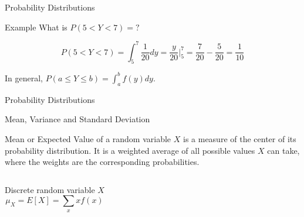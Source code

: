 \documentclass{beamer}\usepackage[]{graphicx}\usepackage[]{color}
\begin{document}
\begin{darkframes}
\begin{frame}[label=lists]{Probability Distributions}
\begin{exampleblock}{Example}
		What is $P(5<Y<7)=?$ 
		
		$$
			P(5<Y<7) = \int_5^7 \frac{1}{20} dy = \frac{y}{20} |_5^7 = \frac{7}{20} - \frac{5}{20} =  \frac{1}{10}
		$$
		
		
		\end{exampleblock}
		
		In general, \alert{$P(a \leq Y \leq b) = \int_a^b f(y)dy$}.
				
	\end{frame}




	\begin{frame}[label=lists]{Probability Distributions}
		\begin{figure} 
			\centering
			\setlength\fboxsep{0pt}
			\setlength\fboxrule{0.5pt}
		\end{figure} 


				
	\end{frame}
	
	
	
	\begin{frame}[label=lists]{Mean, Variance and Standard Deviation}
		
		\begin{definition}
			\alert{Mean} or \alert{Expected Value} of a random variable $X$ is a measure of the center of its probability distribution. It is a weighted average of all possible values $X$ can take, where the weights are the corresponding probabilities. 
		\end{definition}
		
		\begin{columns}[onlytextwidth]
        	Discrete random variable $X$
        	$$
				\mu_X = E[X] = \sum_x x f(x)	        	
        	$$
        	

\end{columns}
\end{frame}
\end{darkframes}
\end{document}
